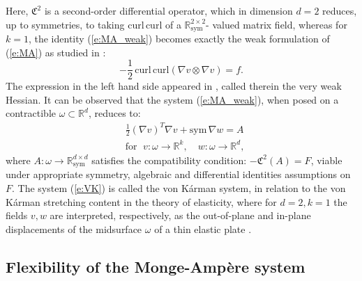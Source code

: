 \documentclass[reqno,twoside,11pt]{amsart}
\newcommand{\sym}{\mathrm{sym}}
\newcommand{\curl}{\mathrm{curl}}
\newcommand{\R}{\mathbb{R}}
\numberwithin{equation}{section}
\theoremstyle{plain}
\theoremstyle{definition}
\begin{document}
Here, $\mathfrak{C}^2$ is a second-order differential operator, 
which in dimension $d=2$ reduces, up to symmetries,
to taking $\mbox{curl}\,\mbox{curl}$ of a $\R^{2\times
  2}_{\sym}$- valued matrix field, whereas for $k=1$, the identity
(\ref{e:MA_weak}) becomes exactly the weak formulation of (\ref{e:MA})
as studied in \cite{lewpak_MA}: 
$$-\frac12\,\curl\,\curl\left( \nabla v\otimes \nabla v\right) = f.$$
The expression in the left hand side appeared in \cite{Iwaniec},
called therein the {very weak Hessian}. It can be observed that
the system (\ref{e:MA_weak}), when posed on a
contractible $\omega\subset\R^d$, reduces to:
\begin{equation}\label{e:VK}
\begin{split}
& \frac12 (\nabla v)^T \nabla v + \sym\, \nabla w = A
\\ & \mbox{for }\; v:\omega\to\R^k, \quad w:\omega\to\R^d,
\end{split}
\end{equation} 
where $A:\omega\to \R^{d\times d}_\sym$ satisfies the
compatibility condition: $-\mathfrak{C}^2(A) = F$, viable 
under appropriate symmetry, algebraic and
differential identities assumptions on $F$. The system (\ref{e:VK}) is called the {
  von K\'arman system}, in relation to the von K\'arman stretching
content in the theory of elasticity, where for $d=2, k=1$ the fields
$v,w$ are interpreted, respectively, as the out-of-plane and in-plane
displacements of the midsurface $\omega$ of a thin elastic plate
\cite{lew_book}. 

\medskip

\subsection{Flexibility of the Monge-Amp\`ere system}
\end{document}
